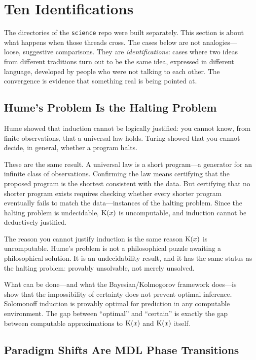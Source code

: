\section{Ten Identifications}
\label{sec:connections}

The directories of the \texttt{science} repo were built separately. This
section is about what happens when those threads cross. The cases below are
not analogies---loose, suggestive comparisons. They are \emph{identifications}:
cases where two ideas from different traditions turn out to be the same idea,
expressed in different language, developed by people who were not talking to
each other. The convergence is evidence that something real is being pointed at.

\subsection{Hume's Problem Is the Halting Problem}

Hume showed that induction cannot be logically justified: you cannot know,
from finite observations, that a universal law holds. Turing showed that
you cannot decide, in general, whether a program halts.

These are the same result. A universal law is a short program---a generator
for an infinite class of observations. Confirming the law means certifying
that the proposed program is the shortest consistent with the data. But
certifying that no shorter program exists requires checking whether every
shorter program eventually fails to match the data---instances of the halting
problem. Since the halting problem is undecidable, $\mathrm{K}(x)$ is uncomputable,
and induction cannot be deductively justified.

The reason you cannot justify induction is the same reason $\mathrm{K}(x)$ is
uncomputable. Hume's problem is not a philosophical puzzle awaiting a
philosophical solution. It is an undecidability result, and it has the same
status as the halting problem: provably unsolvable, not merely unsolved.

What can be done---and what the Bayesian/Kolmogorov framework does---is show
that the impossibility of certainty does not prevent optimal inference.
Solomonoff induction is provably optimal for prediction in any computable
environment. The gap between ``optimal'' and ``certain'' is exactly the gap
between computable approximations to $\mathrm{K}(x)$ and $\mathrm{K}(x)$ itself.

\subsection{Paradigm Shifts Are MDL Phase Transitions}

